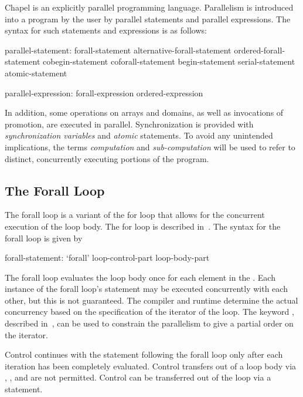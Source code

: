 \label{Parallelism_and_Synchronization}

Chapel is an explicitly parallel programming language.  Parallelism is
introduced into a program by the user by parallel statements and
parallel expressions.  The syntax for such statements and expressions
is as follows:
\begin{syntax}
parallel-statement:
  forall-statement
  alternative-forall-statement
  ordered-forall-statement
  cobegin-statement
  coforall-statement
  begin-statement
  serial-statement
  atomic-statement

parallel-expression:
  forall-expression
  ordered-expression
\end{syntax}

In addition, some operations on arrays and domains, as well as
invocations of promotion, are executed in parallel.  Synchronization
is provided with \emph{synchronization variables} and \emph{atomic}
statements.  To avoid any unintended implications, the
terms \emph{computation} and \emph{sub-computation} will be used to
refer to distinct, concurrently executing portions of the program.

\subsection{The Forall Loop}
\label{Forall}

The forall loop is a variant of the for loop that allows for the
concurrent execution of the loop body. The for loop is described
in~. The syntax for the forall loop is given by
\begin{syntax}
forall-statement:
   `forall' loop-control-part loop-body-part
\end{syntax}

The forall loop evaluates the loop body once for each element in
the .  Each instance of the forall loop's
statement may be executed concurrently with each other, but this is
not guaranteed.  The compiler and runtime determine the actual
concurrency based on the specification of the iterator of the loop.
The keyword , described in~, can be
used to constrain the parallelism to give a partial order on the
iterator.

Control continues with the statement following the forall loop only
after each iteration has been completely evaluated.  Control transfers
out of a loop body via , ,
and  are not permitted.  Control can be transferred out
of the loop via a  statement.


